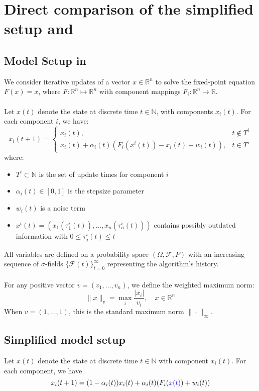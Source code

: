 \section{Direct comparison of the simplified setup and \cite{tsitsiklis1994asynchronous}}\label{app:comparison}
\subsection{Model Setup in \cite{tsitsiklis1994asynchronous}}

We consider iterative updates of a vector $x \in \mathbb{R}^n$ to solve the fixed-point equation $F(x) = x$, where $F: \mathbb{R}^n \mapsto \mathbb{R}^n$ with component mappings $F_i: \mathbb{R}^n \mapsto \mathbb{R}$.\\
\\
Let $x(t)$ denote the state at discrete time $t \in \mathbb{N}$, with components $x_i(t)$. For each component $i$, we have:
\begin{equation}\label{eq:update_rule_tsi}
x_i(t + 1) = 
\begin{cases}
x_i(t), & t \notin T^i \\
x_i(t) + \alpha_i(t)(F_i(x^i(t)) - x_i(t) + w_i(t)), & t \in T^i
\end{cases}
\end{equation}
where:
\begin{itemize}
\item $T^i \subset \mathbb{N}$ is the set of update times for component $i$
\item $\alpha_i(t) \in [0,1]$ is the stepsize parameter
\item $w_i(t)$ is a noise term
\item $x^i(t) = (x_1(\tau_1^i(t)), \ldots, x_n(\tau_n^i(t)))$ contains possibly outdated information with $0 \leq \tau_j^i(t) \leq t$
\end{itemize}
All variables are defined on a probability space $(\Omega, \mathcal{F}, P)$ with an increasing sequence of $\sigma$-fields $\{\mathcal{F}(t)\}_{t=0}^{\infty}$ representing the algorithm's history.\\
\\
For any positive vector $v = (v_1, \ldots, v_n)$, we define the weighted maximum norm:
\begin{equation*}
\|x\|_v = \max_i \frac{|x_i|}{v_i}, \quad x \in \mathbb{R}^n
\end{equation*}
When $v = (1,\ldots,1)$, this is the standard maximum norm $\|\cdot\|_{\infty}$.
\subsection{Simplified model setup}
Let $x(t)$ denote the state at discrete time $t\in\mathbb{N}$ with component $x_i(t)$. For each component, we have
\begin{equation}
    x_i(t+1) = (1-\alpha_i(t))x_i(t) + \alpha_i(t)(F_i(\textcolor{blue}{x(t)}) + w_i(t)) 
\end{equation}\label{eq:x_t}

